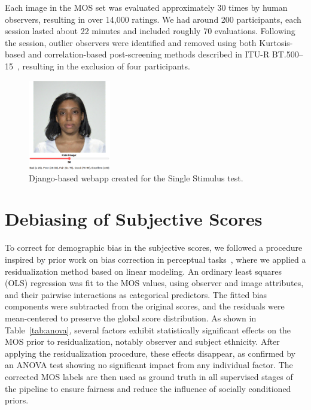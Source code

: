 Each image in the MOS set was evaluated approximately 30 times by human observers, resulting in over 14,000 ratings. We had around 200 participants, each session lasted about 22 minutes and included roughly 70 evaluations. Following the session, outlier observers were identified and removed using both Kurtosis-based and correlation-based post-screening methods described in ITU-R BT.500--15~\cite{ITU-R-BT500}, resulting in the exclusion of four participants.

\begin{figure}
    \centering
    \includegraphics[width=0.32\textwidth]{images/webapp_test.png}
    \caption{Django-based webapp created for the Single Stimulus test.}\label{fig:webapp}
\end{figure}

\section{Debiasing of Subjective Scores}

To correct for demographic bias in the subjective scores, we followed a procedure inspired by prior work on bias correction in perceptual tasks~\cite{clapes2018apparent}, where we applied a residualization method based on linear modeling. An ordinary least squares (OLS) regression was fit to the MOS values, using observer and image attributes, and their pairwise interactions as categorical predictors. The fitted bias components were subtracted from the original scores, and the residuals were mean-centered to preserve the global score distribution. As shown in Table~\ref{tab:anova}, several factors exhibit statistically significant effects on the MOS prior to residualization, notably observer and subject ethnicity. After applying the residualization procedure, these effects disappear, as confirmed by an ANOVA test showing no significant impact from any individual factor. The corrected MOS labels are then used as ground truth in all supervised stages of the pipeline to ensure fairness and reduce the influence of socially conditioned priors.

